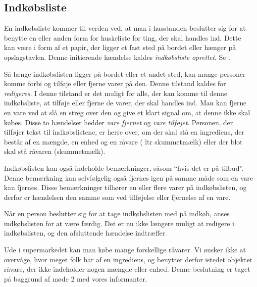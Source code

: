 \subsection{Indkøbsliste}
En indkøbsliste kommer til verden ved, at man i husstanden beslutter sig for at benytte en eller anden form for huskeliste for ting, der skal handles ind. Dette kan være i form af et papir, der ligger et fast sted på bordet eller hænger på opslagstavlen. Denne initierende hændelse kaldes \textit{indkøbsliste oprettet}. Se .

Så længe indkøbslisten ligger på bordet eller et andet sted, kan mange personer komme forbi og tilføje eller fjerne varer på den. Denne tilstand kaldes for \textit{redigeres}. I denne tilstand er det muligt for alle, der kan komme til denne indkøbsliste, at tilføje eller fjerne de varer, der skal handles ind. Man kan \fx fjerne en vare ved at slå en streg over den og give et klart signal om, at denne ikke skal købes. Disse to hændelser hedder \textit{vare fjernet} og \textit{vare tilføjet}. Personen, der tilføjer tekst til indkøbslistene, er herre over, om der skal stå en ingrediens, der består af en mængde, en enhed og en råvare ( ltr skummetmælk) eller der blot skal stå råvaren (\fx skummetmælk).

Indkøbslisten kan også indeholde bemærkninger, såsom ``hvis det er på tilbud''. Denne bemærkning kan selvfølgelig også fjernes igen på samme måde som en vare kan fjernes. Disse bemærkninger tilhører en eller flere varer på indkøbslisten, og derfor er hændelsen den samme som ved tilføjelse eller fjernelse af en vare.

Når en person beslutter sig for at tage indkøbslisten med på indkøb, anses indkøbslisten for at være færdig. Det er nu ikke længere muligt at redigere i indkøbslisten, og den afsluttende hændelse indtræffer. 

Ude i supermarkedet kan man købe mange forskellige råvarer. Vi ønsker ikke at overvåge, hvor meget folk har af en ingrediens, og benytter derfor istedet objektet råvare, der ikke indeholder nogen mængde eller enhed. Denne beslutning er taget på baggrund af møde 2 med vores informanter.

\begin{figure}[H]
	\centering
	\scalebox{0.8}{
		}
		\label{fig:indkoebsliste-adfaerd}
\end{figure}